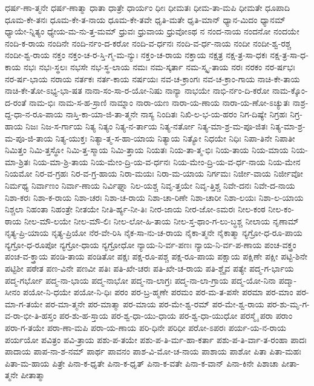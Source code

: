 {ಧರ್ಷ-ಣಾ-ತ್ಮನೇ
ಧರ್ಷ-ಣಾತ್ಮಾ
ಧಾತಾ
ಧಾತ್ರೇ
ಧಾರ್ಯಂ
ಧೀಃ
ಧೀಮತಃ
ಧೀಮ-ತಾ-ಮಪಿ
ಧೀಮತೇ
ಧೂಪಾದಿ
ಧೂಮ-ಕೇ-ತನಃ
ಧೂಮ-ಕೇ-ತ-ನಾಯ
ಧೂಮ-ಕೇ-ತವೇ
ಧೃತಿ-ಮತೇ
ಧೃತಿ-ಮಾನ್
ಧ್ಯಾನ-ಮಿದಂ
ಧ್ಯಾನಮ್
ಧ್ಯಾಯೇ-ನ್ನಿತ್ಯಂ
ಧ್ಯೇಯ-ಮ-ನು-ತ್ತ-ಮಮ್
ಧ್ರುವಃ
ಧ್ರುವಾಯ
ಧ್ರುವೋಽಥ
ನ
ನಂದ-ನಾಯ
ನಂದನೋ
ನಂದಯೇ
ನಂದಿ-ಕ-ರಾಯ
ನಂದಿನೇ
ನಂದಿ-ರ್ನಂ-ದ-ಕರೋ
ನಂದಿ-ವ-ರ್ಧನಃ
ನಂದಿ-ವ-ರ್ಧ-ನಾಯ
ನಂದೀ
ನಂದೀ-ಶ್ವ-ರಶ್ಚ
ನಂದೀ-ಶ್ವ-ರಾಯ
ನಕ್ತಂ
ನಕ್ತಂ-ಚ-ರ-ಸ್ತಿ-ಗ್ಮ-ಮ-ನ್ಯುಃ
ನಕ್ತಂ-ಚ-ರಾಯ
ನಕ್ತಾಯ
ನಕ್ಷತ್ರ
ನಕ್ಷ-ತ್ರ-ಸಾ-ಧಕಃ
ನಕ್ಷ-ತ್ರ-ಸಾ-ಧ-ಕಾಯ
ನಭಃ
ನಭಃ-ಸ್ಥಲಃ
ನಭಸೇ
ನಭ-ಸ್ಥ-ಲಾಯ
ನಮಃ
ನಮ-ಸ್ಕರ್ತಾ
ನಮ-ಸ್ಕೃ-ತಾಯ
ನರಃ
ನರಕಂ
ನರ-ರ್ಷಭಃ
ನರ-ರ್ಷ-ಭಾಯ
ನರಾಯ
ನರ್ತಕಃ
ನರ್ತ-ಕಾಯ
ನರ್ಷಯಃ
ನವ-ಚ-ಕ್ರಾಂಗಃ
ನವ-ಚ-ಕ್ರಾಂ-ಗಾಯ
ನಾಚಿ-ಕೇ-ತಾಯ
ನಾಚಿ-ಕೇ-ತೋ-ಽಭ್ಯ-ಭಾ-ಷತ
ನಾನಾ-ಸಂ-ಸಾ-ರ-ಯೋ-ನಿಷು
ನಾನ್ಯಾ
ನಾಭಯೇ
ನಾಭಿ-ರ್ನಂ-ದಿ-ಕರೋ
ನಾಮ-ಕ್ಕೊಂ-ದ-ರಂತೆ
ನಾಮ-ಭಿಃ
ನಾಮ-ಸ-ಹ-ಸ್ರಾಣಿ
ನಾಮ್ನಾಂ
ನಾರಾ-ಯಣ
ನಾರಾ-ಯ-ಣಾಯ
ನಾರಾ-ಯ-ಣೋ-ಽಚ್ಯುತಃ
ನಾಶ್ರ-ದ್ದ-ಧಾ-ನ-ರೂ-ಪಾಯ
ನಾಸ್ತಿ-ಕಾ-ಯಾ-ಜಿ-ತಾ-ತ್ಮನೇ
ನಾಸ್ಯ
ನಿಂದಿತಃ
ನಿಖಿ-ಲ-ಭ-ಯ-ಹರಂ
ನಿಗ-ದಿಷ್ಯೇ
ನಿಗ್ರಹಃ
ನಿಗ್ರ-ಹಾಯ
ನಿಜಃ
ನಿಜ-ಸ-ರ್ಗಾಯ
ನಿತ್ಯ
ನಿತ್ಯಂ
ನಿತ್ಯ-ನ-ರ್ತಾಯ
ನಿತ್ಯ-ನರ್ತೋ
ನಿತ್ಯ-ಮಾ-ಶ್ರ-ಮ-ಪೂ-ಜಿತಃ
ನಿತ್ಯ-ಮಾ-ಶ್ರ-ಮ-ಪೂ-ಜಿ-ತಾಯ
ನಿತ್ಯ-ಯುಕ್ತಃ
ನಿತ್ಯಾ-ತ್ಮ-ಸ-ಹಾ-ಯಾಯ
ನಿತ್ಯಾಯ
ನಿತ್ಯೋ
ನಿಧಯೇ
ನಿಧಿಃ
ನಿಪಾ-ತಿನೇ
ನಿಪಾತೀ
ನಿಮಿತ್ತಂ
ನಿಮಿ-ತ್ತಸ್ಥೋ
ನಿಮಿ-ತ್ತ-ಸ್ಮಾಯ
ನಿಮಿ-ತ್ತಾಯ
ನಿಯತಃ
ನಿಯ-ತಾ-ತ್ಮ-ಭಿಃ
ನಿಯ-ತಾಯ
ನಿಯ-ಮಾಯ
ನಿಯ-ಮಾ-ಶ್ರಿತಃ
ನಿಯ-ಮಾ-ಶ್ರಿ-ತಾಯ
ನಿಯ-ಮೇಂ-ದ್ರಿ-ಯ-ವ-ರ್ಧನಃ
ನಿಯ-ಮೇಂ-ದ್ರಿ-ಯ-ವ-ರ್ಧ-ನಾಯ
ನಿಯ-ಮೇನ
ನಿಯಮೋ
ನಿರ-ವ-ಗ್ರಹಃ
ನಿರ-ವ-ಗ್ರ-ಹಾಯ
ನಿರಾ-ಮಯಃ
ನಿರಾ-ಮ-ಯಾಯ
ನಿರ್ಗಮಃ
ನಿರ್ಜೀ-ವಾಯ
ನಿರ್ಜೀವೋ
ನಿರ್ಮಥ್ಯ
ನಿರ್ವಾಣಂ
ನಿರ್ವಾ-ಣಾಯ
ನಿರ್ವಿಘ್ನಾ
ನಿಲ-ಯಶ್ಚ
ನಿವೃ-ತ್ತಯೇ
ನಿವೃ-ತ್ತಿಶ್ಚ
ನಿವೇ-ದನಃ
ನಿವೇ-ದ-ನಾಯ
ನಿಶಾ-ಕರಃ
ನಿಶಾ-ಕ-ರಾಯ
ನಿಶಾ-ಚರಃ
ನಿಶಾ-ಚ-ರಾಯ
ನಿಶಾ-ಚಾ-ರಿಣೇ
ನಿಶಾ-ಚಾರೀ
ನಿಶಾ-ಲಯಃ
ನಿಶಾ-ಲ-ಯಾಯ
ನಿಶ್ಚಲಾ
ನಿಹಂತಾ
ನಿಹಂತ್ರೇ
ನೀತಯೇ
ನೀತಿ-ರ್ಹ್ಯ-ನೀ-ತಿಃ
ನೀರ-ಜಾಯ
ನೀರ-ಜೋ-ಽಮರಃ
ನೀಲ-ಕಂಠ
ನೀಲ-ಕಂ-ಠಾಯ
ನೀಲ-ಮೌ-ಲಯೇ
ನೀಲ-ಮೌ-ಲಿಃ
ನೀಲ-ಲೋ-ಹಿ-ತಾಯ
ನೀಲ-ಸ್ತ-ಥಾಂ-ಗ-ಲು-ಬ್ಧಶ್ಚ
ನೀಲಾಯ
ನೃಣಾಮ್
ನೃತ್ಯ-ಪ್ರಿ-ಯಾಯ
ನೃತ್ಯ-ಪ್ರಿಯೋ
ನೆರ-ವೇ-ರಿಸಿ
ನೈಕ-ಸಾ-ನು-ಚ-ರಾಯ
ನೈಕಾ-ತ್ಮನೇ
ನೈಕಾತ್ಮಾ
ನ್ಯಗ್ರೋ-ಧ-ರೂ-ಪಾಯ
ನ್ಯಗ್ರೋ-ಧ-ರೂಪೋ
ನ್ಯಗ್ರೋ-ಧಾಯ
ನ್ಯಗ್ರೋಧೋ
ನ್ಯಾಯ-ನಿ-ರ್ವ-ಪಣಃ
ನ್ಯಾಯ-ನಿ-ರ್ವ-ಪ-ಣಾಯ
ಪಂಚ-ವಕ್ತ್ರಂ
ಪಂಚ-ವ-ಕ್ತ್ರಾಯ
ಪಂಡಿ-ತಾಯ
ಪಂಡಿತೋ
ಪಕ್ಷಃ
ಪಕ್ಷ-ರೂ-ಪಶ್ಚ
ಪಕ್ಷ-ರೂ-ಪಾಯ
ಪಕ್ಷಾಯ
ಪಕ್ಷಿಣೇ
ಪಕ್ಷೀ
ಪಟ್ಟಿ-ಶಿನೇ
ಪಟ್ಟಿಶೀ
ಪಠೇತ
ಪಣ-ವಿನೇ
ಪಣವೀ
ಪತಿಃ
ಪತಿ-ಖೇ-ಚರಃ
ಪತಿ-ಖೇ-ಚ-ರಾಯ
ಪತಿ-ಶ್ಚೈವ
ಪತ್ಯೇ
ಪದ್ಮ-ಗ-ರ್ಭಾಯ
ಪದ್ಮ-ಗರ್ಭೋ
ಪದ್ಮ-ನಾ-ಭಾಯ
ಪದ್ಮ-ನಾಭೋ
ಪದ್ಮ-ನಾ-ಲಾಗ್ರಃ
ಪದ್ಮ-ನಾ-ಲಾ-ಗ್ರಾಯ
ಪದ್ಮ-ಯೋ-ನಿನಾ
ಪದ್ಮಾ-ಸೀನಂ
ಪಯೋ-ನಿ-ಧಯೇ
ಪಯೋ-ನಿ-ಧಿಃ
ಪರಂ
ಪರ-ಬ್ರ-ಹ್ಮಣೇ
ಪರಮಂ
ಪರ-ಮ-ತ-ಪಸೇ
ಪರಮಾ
ಪರ-ಮಾಂ
ಪರ-ಮಾ-ಗ-ತಯೇ
ಪರ-ಮಾ-ತ್ಮನೇ
ಪರ-ಮಾತ್ಮಾ
ಪರ-ಮಾಯ
ಪರ-ಮೇ-ಶ್ವ-ರಮ್
ಪರ-ಮೇ-ಶ್ವ-ರಾಯ
ಪರ-ಶು-ಮೃ-ಗ-ವ-ರಾ-ಭೀ-ತಿ-ಹಸ್ತಂ
ಪರ-ಶು-ಹ-ಸ್ತಾಯ
ಪರ-ಶ್ವ-ಧಾ-ಯು-ಧಾಯ
ಪರ-ಶ್ವ-ಧಾ-ಯುಧೋ
ಪರಸ್ಮೈ
ಪರಾ
ಪರಾಂ
ಪರಾ-ಗ-ತಯೇ
ಪರಾ-ಣಾ-ಮಪಿ
ಪರಾ-ಯ-ಣಾಯ
ಪರಿ-ಧಿನೇ
ಪರಿಧೀ
ಪರೋ-ಽಪರಃ
ಪರ್ಯ-ಯ-ನ-ರಾಯ
ಪರ್ಯಯೋ
ಪವಿತ್ರಂ
ಪವಿ-ತ್ರಾಯ
ಪಶು-ಪ-ತಯೇ
ಪಶು-ಪ-ತಿ-ರ್ಮ-ಹಾ-ಕರ್ತಾ
ಪಶು-ಪ-ತಿ-ರ್ವಾ-ತ-ರಂಹಾ
ಪಾದಃ
ಪಾದಾಯ
ಪಾಪ-ನಾ-ಶ-ನಮ್
ಪಾರ್ಥ
ಪಾವನಂ
ಪಾಶ-ವಿ-ಮೋ-ಚ-ನಾಯ
ಪಾಶಾಯ
ಪಾಶೋ
ಪಿತಾ
ಪಿತಾ-ಮಹಃ
ಪಿತಾ-ಮ-ಹಾಯ
ಪಿತ್ರೇ
ಪಿನಾ-ಕ-ಧೃತೇ
ಪಿನಾ-ಕ-ಧೃತ್
ಪಿನಾ-ಕ-ವತೇ
ಪಿನಾ-ಕ-ವಾನ್
ಪಿನಾ-ಕಿನೇ
ಪಿಶಾಚಾ
ಪೀತಾ-ತ್ಮನೇ
ಪೀತಾತ್ಮಾ
}
